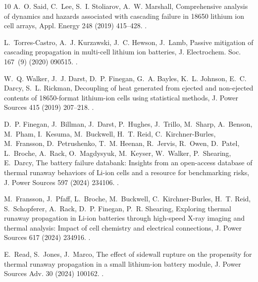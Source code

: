 \documentclass[preprint,12pt]{elsarticle}
\begin{document}
\begin{thebibliography}{10}
A.~O. Said, C.~Lee, S.~I. Stoliarov, A.~W. Marshall, Comprehensive analysis of
  dynamics and hazards associated with cascading failure in 18650 lithium ion
  cell arrays, Appl. Energy 248 (2019) 415--428.
\newblock \href {https://doi.org/10.1016/j.apenergy.2019.04.141}
  {}.

L.~Torres-Castro, A.~J. Kurzawski, J.~C. Hewson, J.~Lamb, Passive mitigation of
  cascading propagation in multi-cell lithium ion batteries, J. Electrochem.
  Soc. 167~(9) (2020) 090515.
\newblock \href {https://doi.org/10.1149/1945-7111/ab84fa}
  {}.

W.~Q. Walker, J.~J. Darst, D.~P. Finegan, G.~A. Bayles, K.~L. Johnson, E.~C.
  Darcy, S.~L. Rickman, Decoupling of heat generated from ejected and
  non-ejected contents of 18650-format lithium-ion cells using statistical
  methods, J. Power Sources 415 (2019) 207--218.
\newblock \href {https://doi.org/10.1016/j.jpowsour.2018.10.099}
  {}.

D.~P. Finegan, J.~Billman, J.~Darst, P.~Hughes, J.~Trillo, M.~Sharp, A.~Benson,
  M.~Pham, I.~Kesuma, M.~Buckwell, H.~T. Reid, C.~Kirchner-Burles, M.~Fransson,
  D.~Petrushenko, T.~M. Heenan, R.~Jervis, R.~Owen, D.~Patel, L.~Broche,
  A.~Rack, O.~Magdysyuk, M.~Keyser, W.~Walker, P.~Shearing, E.~Darcy, The
  battery failure databank: Insights from an open-access database of thermal
  runaway behaviors of {Li}-ion cells and a resource for benchmarking risks, J.
  Power Sources 597 (2024) 234106.
\newblock \href {https://doi.org/10.1016/j.jpowsour.2024.234106}
  {}.

M.~Fransson, J.~Pfaff, L.~Broche, M.~Buckwell, C.~Kirchner-Burles, H.~T. Reid,
  S.~Schopferer, A.~Rack, D.~P. Finegan, P.~R. Shearing, Exploring thermal
  runaway propagation in {Li}-ion batteries through high-speed {X}-ray imaging
  and thermal analysis: Impact of cell chemistry and electrical connections, J.
  Power Sources 617 (2024) 234916.
\newblock \href {https://doi.org/10.1016/j.jpowsour.2024.234916}
  {}.

E.~Read, S.~Jones, J.~Marco, The effect of sidewall rupture on the propensity
  for thermal runaway propagation in a small lithium-ion battery module, J.
  Power Sources Adv. 30 (2024) 100162.
\newblock \href {https://doi.org/10.1016/j.powera.2024.100162}
  {}.


\end{thebibliography}
\end{document}
